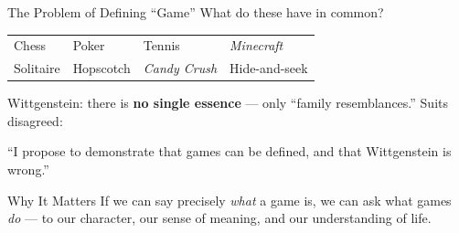 \documentclass[aspectratio=169,11pt]{beamer}
\begin{document}
\begin{frame}[t]{The Problem of Defining ``Game''}
\footnotesize
What do these have in common?

\vspace{0.1cm}
\begin{center}
\footnotesize
\begin{tabular}{llll}
\toprule
Chess & Poker & Tennis & \emph{Minecraft} \\
Solitaire & Hopscotch & \emph{Candy Crush} & Hide-and-seek \\
\bottomrule
\end{tabular}
\end{center}

\vspace{0.15cm}
Wittgenstein: there is \textbf{no single essence} --- only ``family resemblances.'' Suits disagreed:

\vspace{0.1cm}
\begin{quotebox}
\footnotesize
``I propose to demonstrate that games can be defined, and that Wittgenstein is wrong.''
\end{quotebox}

\begin{alertblock}{Why It Matters}
\scriptsize
If we can say precisely \emph{what} a game is, we can ask what games \emph{do} --- to our character, our sense of meaning, and our understanding of life.
\end{alertblock}
\end{frame}
\end{document}
